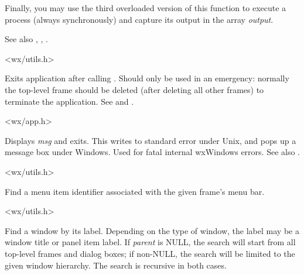 Finally, you may use the third overloaded version of this function to execute
a process (always synchronously) and capture its output in the array 
{\it output}.

See also , , 
.


<wx/utils.h>

\label{wxexit}


Exits application after calling .
Should only be used in an emergency: normally the top-level frame
should be deleted (after deleting all other frames) to terminate the
application. See  and .


<wx/app.h>

\label{wxfatalerror}


Displays {\it msg} and exits. This writes to standard error under Unix,
and pops up a message box under Windows. Used for fatal internal
wxWindows errors. See also .


<wx/utils.h>



Find a menu item identifier associated with the given frame's menu bar.


<wx/utils.h>



Find a window by its label. Depending on the type of window, the label may be a window title
or panel item label. If {\it parent} is NULL, the search will start from all top-level
frames and dialog boxes; if non-NULL, the search will be limited to the given window hierarchy.
The search is recursive in both cases.

